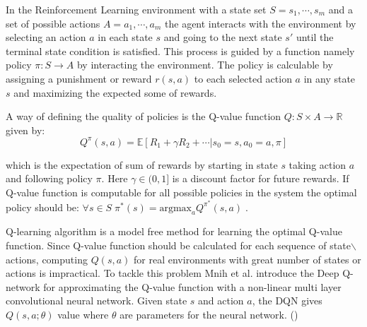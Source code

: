 In the Reinforcement Learning environment with a state set $S = s_1, \cdots, s_m$ and a  set of possible actions $A = a_1, \cdots, a_m$ the agent interacts with the environment by selecting an action $a$ in each state $s$ and going to the next state $s'$ until the terminal state condition is satisfied. This process is guided by a function namely policy $\pi : S \longrightarrow A$ by interacting the environment. The policy is calculable by assigning a punishment or reward $r(s, a)$ to each selected action $a$ in any state $s$ and maximizing the expected some of rewards.  

A way of defining the quality of policies is the Q-value function $Q : S \times A \longrightarrow \mathbb{R}$ given by: 
$$Q^{\pi}(s, a) = \mathbb{E}[R_1+ \gamma R_2 + \cdots | s_0 = s, a_0 =a, \pi]$$

which is the expectation of sum of rewards by starting in state $s$ taking action $a$ and following policy $\pi$. Here $\gamma \in (0, 1]$ is a discount factor for future rewards. If Q-value function is computable for all possible policies in the system the optimal policy should be: $\forall  s \in S \; \pi^*(s) = \text{argmax}_a Q^{\pi^*}(s, a) \; $.  

Q-learning algorithm \cite{sutton1998} is a model free method for learning the optimal Q-value function. Since Q-value function should be calculated for each sequence of state$\backslash$actions, computing $Q(s, a)$ for real environments with great number of states or actions  is impractical.  To tackle this problem Mnih et al. introduce the Deep Q-network for approximating the Q-value function with a non-linear multi layer convolutional neural network.  Given state $s$ and action $a$, the DQN gives $Q(s, a; \theta)$ value where $\theta$ are parameters for the neural network. ()



